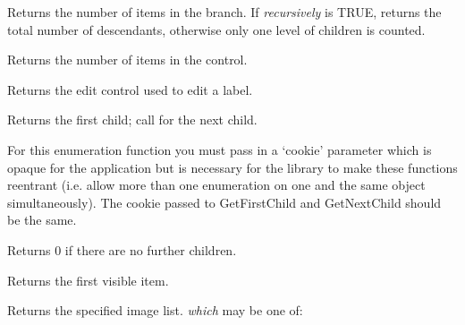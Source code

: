 \label{wxtreectrlgetchildrencount}


Returns the number of items in the branch. If {\it recursively} is TRUE, returns the total number
of descendants, otherwise only one level of children is counted.

\label{wxtreectrlgetcount}


Returns the number of items in the control.

\label{wxtreectrlgeteditcontrol}


Returns the edit control used to edit a label.

\label{wxtreectrlgetfirstchild}


Returns the first child; call  for the next child.

For this enumeration function you must pass in a `cookie' parameter
which is opaque for the application but is necessary for the library
to make these functions reentrant (i.e. allow more than one
enumeration on one and the same object simultaneously). The cookie passed to
GetFirstChild and GetNextChild should be the same.

Returns 0 if there are no further children.



\label{wxtreectrlgetfirstvisibleitem}


Returns the first visible item.

\label{wxtreectrlgetimagelist}


Returns the specified image list. {\it which} may be one of:

